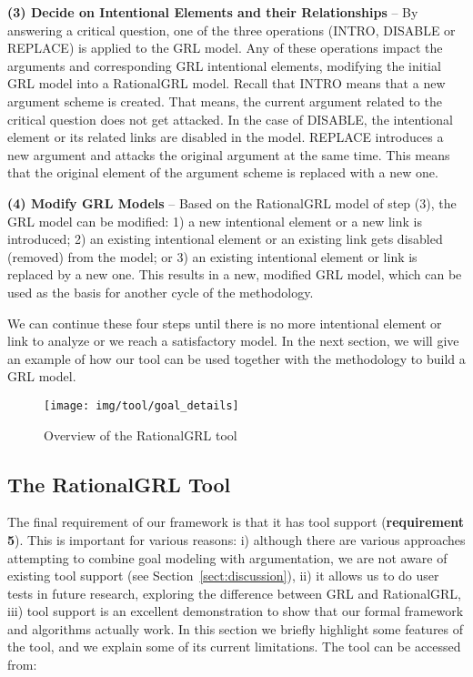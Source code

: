 \textbf{(3) Decide on Intentional Elements and their Relationships} -- By answering a critical question, one of the three operations (\textsf{INTRO}, \textsf{DISABLE} or \textsf{REPLACE}) is applied to the GRL model. Any of these operations impact the arguments and corresponding GRL intentional elements, modifying the initial GRL model into a RationalGRL model. Recall that \textsf{INTRO} means that 
a new argument scheme is created. That means, the current argument related to the critical question does not get attacked.  In the case of \textsf{DISABLE}, the intentional element or its related links are disabled in the model. \textsf{REPLACE} introduces a new argument and attacks the original argument at the same time. This means that the original element of the argument scheme is replaced with a new one.   

\textbf{(4) Modify GRL Models} -- Based on the RationalGRL model of step (3), the GRL model can be modified: 1) a new intentional element or a new link is introduced; 2) an existing intentional element or an existing link gets disabled (removed) from the model; or 3) an existing intentional element or link is replaced by a new one. This results in a new, modified GRL model, which can be used as the basis for another cycle of the methodology. 

We can continue these four steps until there is no more intentional element or link to analyze or we reach a satisfactory model. In the next section, we will give an example of how our tool can be used together with the methodology to build a GRL model.  

\begin{figure*}[t]
\centering
\texttt{[image: img/tool/goal\_details]}
\caption{Overview of the RationalGRL tool}
\label{fig:tool:overview}
\end{figure*}


\subsection{The RationalGRL Tool}
\label{sect:tool}

The final requirement of our framework is that it has tool support (\textbf{requirement 5}). This is important for various reasons: i) although there are various approaches attempting to combine goal modeling with argumentation, we are not aware of existing tool support (see Section~\ref{sect:discussion}), ii) it allows us to do user tests in future research, exploring the difference between GRL and RationalGRL, iii) tool support is an excellent demonstration to show that our formal framework and algorithms actually work. In this section we briefly highlight some features of the tool, and we explain some of its current limitations. The tool can be accessed from:

